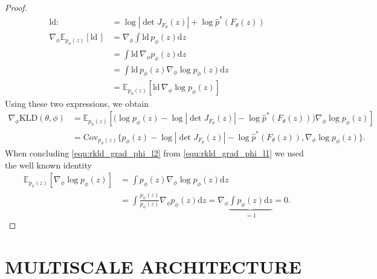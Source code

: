 \documentclass[twoside]{article}
\newcommand{\D}{\mathrm{d}}
\newcommand{\KLD}{\mathrm{KLD}}
\newcommand{\Cov}{\mathrm{Cov}}
\newcommand{\E}{\mathds{E}}
\begin{document}
\begin{proof}
	\begin{equation}
	    \begin{split}
	    \mathrm{ld} :&= \log\left| \det J_{F_\theta}(z)\right| + \log \hat{p}^*(F_\theta(z)) \\
		\nabla_\phi \E_{p_\phi(z)}\left[ \mathrm{ld}\, \right] & = \nabla_\phi \int \mathrm{ld}\, p_\phi(z) \D z \\
		& = \int \mathrm{ld}\, \nabla_\phi p_\phi(z) \D z \\
		& = \int \mathrm{ld}\, p_\phi(z) \nabla_\phi \log p_\phi(z) \D z \\
		& = \E_{p_\phi(z)}\left[ \mathrm{ld}\, \nabla_\phi \log p_\phi(z) \right] 
	    \end{split}
	\end{equation}
	Using these two expressions, we obtain
	\begin{align}
		\nabla_\phi \KLD(\theta, \phi) & = \E_{p_\phi(z)}\left[ \big( \log p_\phi(z) - \log\left| \det J_{F_\theta}(z)\right| - \log \hat{p}^*(F_\theta(z)) \big) \nabla_\phi \log p_\phi(z) \right] \label{equ:rkld_grad_phi_l1} \\
		& = \Cov_{p_\phi(z)}\big\{ p_\phi(z) - \log\left| \det J_{F_\theta}(z)\right|  - \log \hat{p}^*(F_\theta(z)), \nabla_\phi \log p_\phi(z)\big\}. \label{equ:rkld_grad_phi_l2}
	\end{align}
	When concluding \eqref{equ:rkld_grad_phi_l2} from \eqref{equ:rkld_grad_phi_l1} we used the well known identity
	\begin{equation}
	    \begin{split}
	        \E_{p_\phi(z)}\left[ \nabla_\phi \log p_\phi(z)\right] &= \int p_\phi(z)\nabla_\phi \log p_\phi(z) \D z \\ 
	        &= \int \frac{p_\phi(z)}{p_\phi(z)}\nabla_\phi p_\phi(z) \D z = \nabla_\phi \underbrace{\int p_\phi(z) \D z}_{=1} = 0.
	    \end{split}
	\end{equation}
\end{proof}


\section{MULTISCALE ARCHITECTURE}
\end{document}
